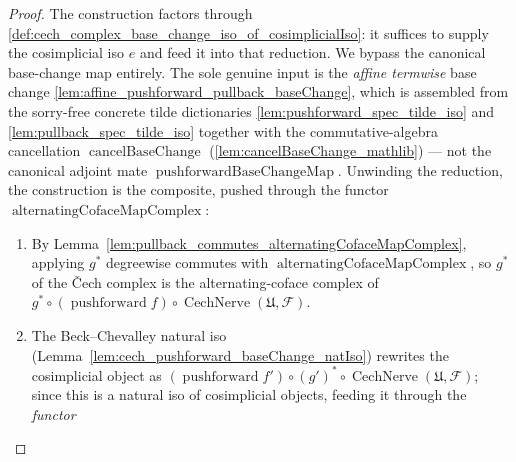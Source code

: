 \begin{proof}
  The construction factors through
  \cref{def:cech_complex_base_change_iso_of_cosimplicialIso}: it suffices to supply the
  cosimplicial iso \(e\) and feed it into that reduction. We bypass the canonical
  base-change map entirely. The sole genuine input is the \emph{affine termwise} base
  change \cref{lem:affine_pushforward_pullback_baseChange}, which is assembled from the
  sorry-free concrete tilde dictionaries \cref{lem:pushforward_spec_tilde_iso} and
  \cref{lem:pullback_spec_tilde_iso} together with the commutative-algebra cancellation
  \(\operatorname{cancelBaseChange}\) (\cref{lem:cancelBaseChange_mathlib}) --- not the
  canonical adjoint mate \(\operatorname{pushforwardBaseChangeMap}\). Unwinding the
  reduction, the construction is the composite,
  pushed through the functor \(\operatorname{alternatingCofaceMapComplex}\):
  \begin{enumerate}
    \item By Lemma~\ref{lem:pullback_commutes_alternatingCofaceMapComplex}, applying
      \(g^*\) degreewise commutes with \(\operatorname{alternatingCofaceMapComplex}\),
      so \(g^*\) of the {\v C}ech complex is the alternating-coface complex of
      \(g^* \circ (\operatorname{pushforward} f) \circ
      \operatorname{CechNerve}(\mathfrak{U}, \mathcal{F})\).
    \item The Beck--Chevalley natural iso
      (Lemma~\ref{lem:cech_pushforward_baseChange_natIso}) rewrites the cosimplicial
      object as \((\operatorname{pushforward} f') \circ (g')^* \circ
      \operatorname{CechNerve}(\mathfrak{U}, \mathcal{F})\); since this is a natural iso
      of cosimplicial objects, feeding it through the \emph{functor}

\end{enumerate}
\end{proof}
